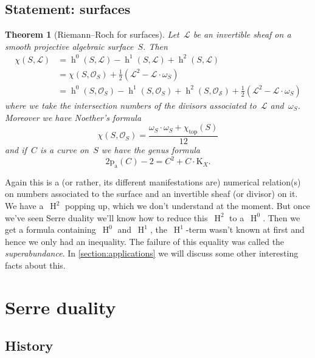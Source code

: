 \documentclass[10pt,a4paper]{article}
\theoremstyle{lecture}
\newtheorem{theorem}{Theorem}
\DeclareMathOperator\hh{h}
\DeclareMathOperator\HH{H}
\begin{document}
\subsection{Statement: surfaces}
\label{subsection:statement-surfaces}
\begin{theorem}[Riemann--Roch for surfaces]
  \label{theorem:riemann-roch-surfaces}
  Let~$\mathcal{L}$ be an invertible sheaf on a smooth projective algebraic surface~$S$. Then
  \begin{equation}
    \begin{aligned}
    \chi(S,\mathcal{L})&=\hh^0(S,\mathcal{L})-\hh^1(S,\mathcal{L})+\hh^2(S,\mathcal{L}) \\
    &=\chi(S,\mathcal{O}_S)+\frac{1}{2}(\mathcal{L}^2-\mathcal{L}\cdot\omega_S) \\
    &=\hh^0(S,\mathcal{O}_S)-\hh^1(S,\mathcal{O}_S)+\hh^2(S,\mathcal{O_S})+\frac{1}{2}(\mathcal{L}^2-\mathcal{L}\cdot\omega_S)
    \end{aligned}
  \end{equation}
  where we take the intersection numbers of the divisors associated to~$\mathcal{L}$ and~$\omega_S$. Moreover we have \emph{Noether's formula}
  \begin{equation}
    \chi(S,\mathcal{O}_S)=\frac{\omega_S\cdot\omega_S+\chi_{\mathrm{top}}(S)}{12}
  \end{equation}
  and if~$C$ is a curve on~$S$ we have the \emph{genus formula}
  \begin{equation}
    2\mathrm{p}_{\mathrm{a}}(C)-2=C^2+C\cdot\mathrm{K}_X.
  \end{equation}
\end{theorem}
Again this is a (or rather, its different manifestations are) numerical relation(s) on numbers associated to the surface and an invertible sheaf (or divisor) on it. We have a~$\HH^2$ popping up, which we don't understand at the moment. But once we've seen Serre duality we'll know how to reduce this~$\HH^2$ to a~$\HH^0$. Then we get a formula containing~$\HH^0$ and~$\HH^1$, the~$\HH^1$-term wasn't known at first and hence we only had an inequality. The failure of this equality was called the \emph{superabundance}. In \cref{section:applications} we will discuss some other interesting facts about this.


\section{Serre duality}
\label{section:serre-duality}
\subsection{History}
\label{subsection-serre-duality-history}
\end{document}
